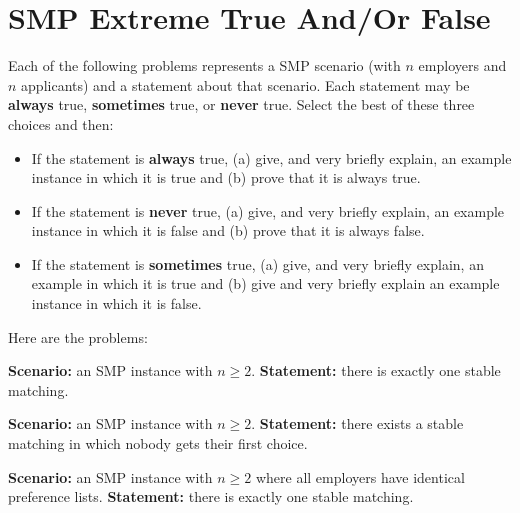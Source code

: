 \section{SMP Extreme True And/Or False}

Each of the following problems represents a SMP scenario (with $n$ employers and $n$ applicants) and a statement about that scenario. Each statement may be \textbf{always} true, \textbf{sometimes} true, or \textbf{never} true. Select the best of these three choices and then:
	\begin{itemize}
		\item If the statement is \textbf{always} true, (a) give, and very briefly explain, an example instance in which it is true and (b) prove that it is always true.
		\item If the statement is \textbf{never} true, (a) give, and very briefly explain, an example instance in which it is false and (b) prove that it is always false.
		\item If the statement is \textbf{sometimes} true, (a) give, and very briefly explain, an example in which it is true and (b) give and very briefly explain an example instance in which it is false.
	\end{itemize}
	Here are the problems:
	
	\begin{questions}
		\question[3] \textbf{Scenario:} an SMP instance with $n \ge 2$. \textbf{Statement:} there is exactly one stable matching.
        \ifsolutions\fi
		
	\question[4] \textbf{Scenario:} an SMP instance with $n \ge 2$. \textbf{Statement:} there exists a stable matching in which nobody gets their first choice.
        \ifsolutions\fi

        \question[4] \textbf{Scenario:} an SMP instance with $n \ge 2$ where all employers have identical preference lists. \textbf{Statement:} there is exactly one stable matching.
        \ifsolutions\fi
  
	\end{questions}